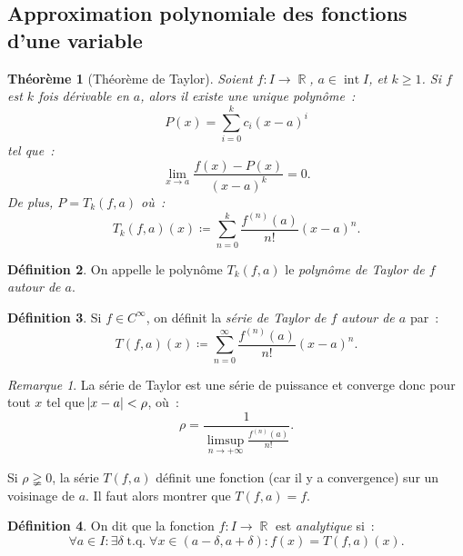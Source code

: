 \documentclass{article}
\DeclareMathOperator{\intr}{int}
\DeclareMathOperator{\R}{\mathbb R}
\DeclareMathOperator{\tq}{ t.q. }
\newtheorem{thm}{Théorème}[section]
\theoremstyle{definition}
\newtheorem{déf}[thm]{Définition}
\theoremstyle{remark}
\newtheorem*{rmq}{Remarque}
\begin{document}
	\subsection{Approximation polynomiale des fonctions d’une variable}
		\begin{thm}[Théorème de Taylor] Soient $f : I \to \R$, $a \in \intr I$, et $k \geq 1$. Si $f$ est $k$ fois dérivable en $a$, alors il existe une unique
		polynôme~:
		\[P(x) = \sum_{i=0}^kc_i(x-a)^i\]
		tel que~:
		\[\lim_{x \to a}\frac {f(x)-P(x)}{(x-a)^k} = 0.\]
		De plus, $P = T_k(f, a)$ où~:
		\[T_k(f, a)(x) \coloneqq \sum_{n=0}^k\frac {f^{(n)}(a)}{n!}(x-a)^n.\]
		\end{thm}

		\begin{déf} On appelle le polynôme $T_k(f, a)$ le \emph{polynôme de Taylor de $f$ autour de $a$}. \end{déf}

		\begin{déf} Si $f \in C^\infty$, on définit la \emph{série de Taylor de $f$ autour de $a$} par~:
		\[T(f, a)(x) \coloneqq \sum_{n=0}^\infty\frac {f^{(n)}(a)}{n!}(x-a)^n.\]
		\end{déf}

		\begin{rmq} La série de Taylor est une série de puissance et converge donc pour tout $x$ tel que $\abs {x-a} < \rho$, où~:
		\[\rho = \frac 1{\limsup_{n \to +\infty}\frac {f^{(n)}(a)}{n!}}.\]

		Si $\rho \gneqq 0$, la série $T(f, a)$ définit une fonction (car il y a convergence) sur un voisinage de $a$. Il faut alors montrer que $T(f, a) = f$.
		\end{rmq}

		\begin{déf} On dit que la fonction $f : I \to \R$ est \emph{analytique} si~:
		\[\forall a \in I : \exists \delta \tq \forall x \in (a-\delta, a+\delta) : f(x) = T(f, a)(x).\]
		\end{déf}
\end{document}
